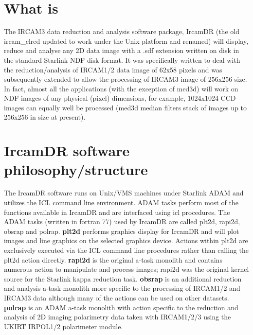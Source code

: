 \begin{latexonly}
   \setlength{\parskip}{0mm}
   \latexonlytoc
   \setlength{\parskip}{\medskipamount}
\end{latexonly}


\section{What is }

The {\sc IRCAM3} data reduction and analysis software package, {\sc IrcamDR} (the old
ircam\_clred updated to work under the Unix platform and renamed) will
display, reduce and analyse any 2D data image with a .sdf extension
written on disk in the standard Starlink NDF disk format.  It was
specifically written to deal with the reduction/analysis of {\sc IRCAM1/2} data
image of 62x58 pixels and was subsequently extended to allow the
processing of {\sc IRCAM3} image of 256x256 size.  In fact, almost all the
applications (with the exception of med3d) will work on NDF images of any
physical (pixel) dimensions, for example, 1024x1024 CCD images can
equally well be processed (med3d median filters stack of images up to
256x256 in size at present).

\section{{\sc IrcamDR} software philosophy/structure}

The {\sc IrcamDR} software runs on Unix/VMS machines under Starlink {\sc ADAM} and
utilizes the ICL command line environment.  {\sc ADAM} tasks perform most of
the functions available in {\sc IrcamDR} and are interfaced using icl
procedures.  The {\sc ADAM} tasks (written in fortran 77) used by {\sc IrcamDR} are
called plt2d, rapi2d, obsrap and polrap.  {\bf plt2d} performs graphics display
for {\sc IrcamDR} and will plot images and line graphics on the selected
graphics device.  Actions within plt2d are exclusively executed via the
ICL command line procedures rather than calling the plt2d action
directly. {\bf rapi2d} is the original a-task monolith and contains numerous
action to manipulate and process images; rapi2d was the original kernel
source for the Starlink kappa reduction task.  {\bf obsrap} is an additional
reduction and analysis a-task monolith more specific to the processing of
{\sc IRCAM1/2} and {\sc IRCAM3} data although many of the actions can be used on
other datasets.  {\bf polrap} is an {\sc ADAM} a-task monolith with action specific
to the reduction and analysis of 2D imaging polarimetry data taken with
{\sc IRCAM1/2/3} using the {\sc UKIRT} IRPOL1/2 polarimeter module.

